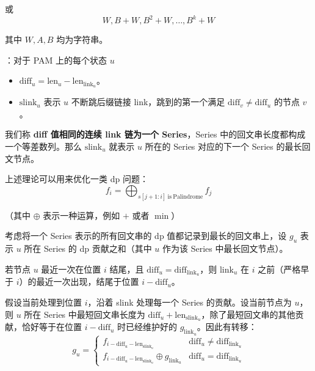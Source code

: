 或
\[
W, B + W, B^2 + W, \dots, B^k + W
\]

其中 $W, A, B$ 均为字符串。

：对于 PAM 上的每个状态 $u$

\begin{itemize}
    \item $\mathrm{diff}_u = \mathrm{len}_u - \mathrm{len}_{\mathrm{link}_u}$。
    \item $\mathrm{slink}_u$ 表示 $u$ 不断跳后缀链接 link，跳到的第一个满足 $\mathrm{diff}_v \neq \mathrm{diff}_u$ 的节点 $v$。
\end{itemize}

我们称 \textbf{diff 值相同的连续 link 链为一个 Series}，Series 中的回文串长度都构成一个等差数列。那么 $\mathrm{slink}_u$ 就表示 $u$ 所在的 Series 对应的下一个 Series 的最长回文节点。

上述理论可以用来优化一类 dp 问题：
\[
f_i = \bigoplus_{s[j + 1 : i] \ \text{is} \ \text{Palindrome}} f_j
\]

（其中 $\oplus$ 表示一种运算，例如 $+$ 或者 $\min$）

考虑将一个 Series 表示的所有回文串的 dp 值都记录到最长的回文串上，设 $g_u$ 表示 $u$ 所在 Series 的 dp 贡献之和（其中 $u$ 作为该 Series 中最长回文节点）。

若节点 $u$ 最近一次在位置 $i$ 结尾，且 $\mathrm{diff}_u = \mathrm{diff}_{\mathrm{link}_u}$，则 $\mathrm{link}_u$ 在 $i$ 之前（严格早于 $i$）的最近一次出现，结尾于位置 $i - \mathrm{diff}_u$。

假设当前处理到位置 $i$，沿着 slink 处理每一个 Series 的贡献。设当前节点为 $u$，则 $u$ 所在 Series 中最短回文串长度为 $\mathrm{diff}_u + \mathrm{len}_{\mathrm{slink}_u}$，除了最短回文串的其他贡献，恰好等于在位置 $i - \mathrm{diff}_u$ 时已经维护好的 $g_{\mathrm{link}_u}$。因此有转移：
\[
g_u = \begin{cases}
f_{i - \mathrm{diff}_u - \mathrm{len}_{\mathrm{slink}_u}} & \mathrm{diff}_u \neq \mathrm{diff}_{\mathrm{link}_u} \\
f_{i - \mathrm{diff}_u - \mathrm{len}_{\mathrm{slink}_u}} \oplus g_{\mathrm{link}_u} & \mathrm{diff}_u = \mathrm{diff}_{\mathrm{link}_u}
\end{cases}
\]
